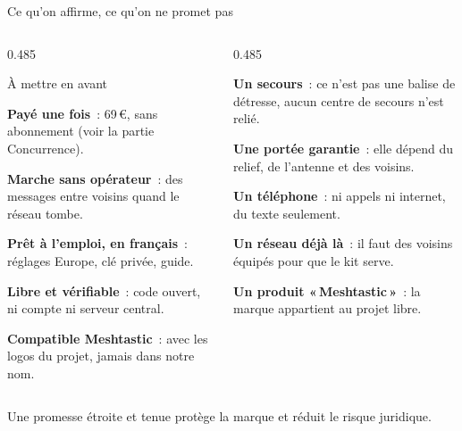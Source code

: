 \begin{frame}{Ce qu'on affirme, ce qu'on ne promet pas}
  \begin{columns}[T]
    \begin{column}{0.485\textwidth}
      \begin{encadre}{À mettre en avant}
        \footnotesize\raggedright
        \oui\textbf{Payé une fois}~: 69\,€, sans abonnement (voir la partie Concurrence).\par\vspace{1pt}
        \oui\textbf{Marche sans opérateur}~: des messages entre voisins quand le réseau tombe.\par\vspace{1pt}
        \oui\textbf{Prêt à l'emploi, en français}~: réglages Europe, clé privée, guide.\par\vspace{1pt}
        \oui\textbf{Libre et vérifiable}~: code ouvert, ni compte ni serveur central.\par\vspace{1pt}
        \oui\textbf{Compatible Meshtastic}~: avec les logos du projet, jamais dans notre nom.\par
      \end{encadre}
    \end{column}
    \begin{column}{0.485\textwidth}
      \begin{remarque}
        \footnotesize\raggedright
        \non\textbf{Un secours}~: ce n'est pas une balise de détresse, aucun centre de secours n'est relié.\par\vspace{1pt}
        \non\textbf{Une portée garantie}~: elle dépend du relief, de l'antenne et des voisins.\par\vspace{1pt}
        \non\textbf{Un téléphone}~: ni appels ni internet, du texte seulement.\par\vspace{1pt}
        \non\textbf{Un réseau déjà là}~: il faut des voisins équipés pour que le kit serve.\par\vspace{1pt}
        \non\textbf{Un produit «\,Meshtastic\,»}~: la marque appartient au projet libre.\par
      \end{remarque}
    \end{column}
  \end{columns}
  \vspace{0.08cm}
  \begin{pcompact}\centering\footnotesize
    Une promesse étroite et tenue protège la marque et réduit le risque juridique.
  \end{pcompact}
\end{frame}
